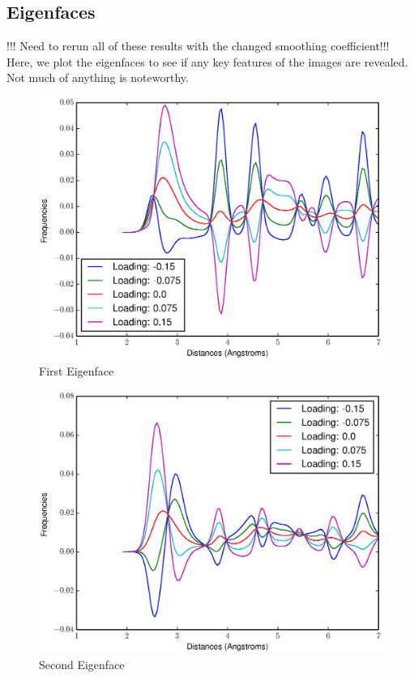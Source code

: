 \documentclass[12pt,letterpaper]{article}
\begin{document}
\subsection{Eigenfaces}
!!! Need to rerun all of these results with the changed smoothing coefficient!!!
Here, we plot the eigenfaces to see if any key features of the images are
revealed. Not much of anything is noteworthy.

\begin{figure}[ht]
  \begin{center}
    \includegraphics[scale=0.8]{figs/eigenface1.eps}
    \caption{First Eigenface}
  \end{center}
\end{figure}

\begin{figure}[ht]
  \begin{center}
    \includegraphics[scale=0.8]{figs/eigenface2.eps}
    \caption{Second Eigenface}
  \end{center}
\end{figure}
\end{document}
